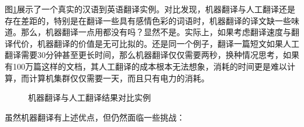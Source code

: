 \parinterval 图\ref{fig:1-7}展示了一个真实的汉语到英语翻译实例。对比发现，机器翻译与人工翻译还是存在差距的，特别是在翻译一些具有感情色彩的词语时，机器翻译的译文缺一些味道。那么，机器翻译一点用都没有吗？显然不是。实际上，如果考虑翻译速度与翻译代价，机器翻译的价值是无可比拟的。还是同一个例子，翻译一篇短文如果人工翻译需要30分钟甚至更长时间，那么机器翻译仅仅需要两秒，换种情况思考，如果有100万篇这样的文档，其人工翻译的成本根本无法想象，消耗的时间更是难以计算，而计算机集群仅仅需要一天，而且只有电力的消耗。

\begin{figure}[htp]
    \centering

    \caption{机器翻译与人工翻译结果对比实例}
    \label{fig:1-7}
\end{figure}

\parinterval 虽然机器翻译有上述优点，但仍然面临一些挑战：


